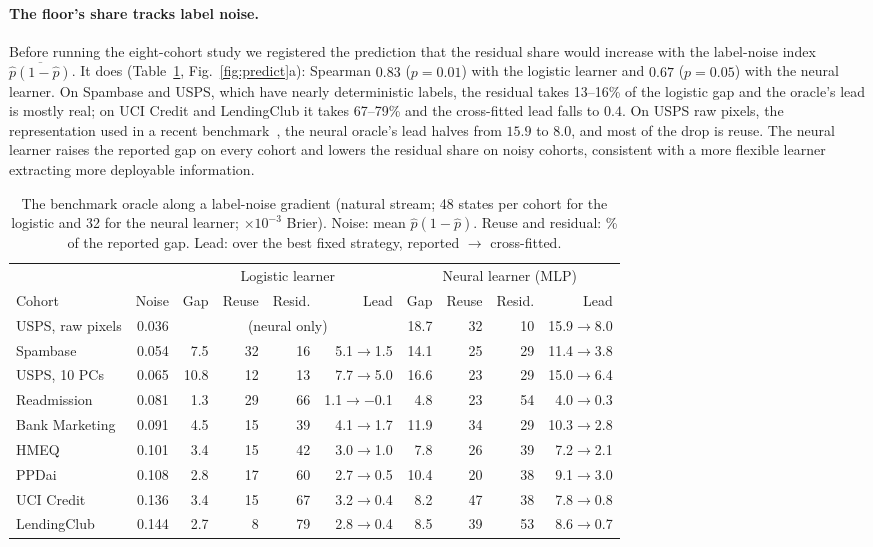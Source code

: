 \documentclass[runningheads]{llncs}
\begin{document}
\paragraph{The floor's share tracks label noise.} Before running the eight-cohort study we registered the prediction that the residual share would increase with the label-noise index $\overline{\hat p(1-\hat p)}$. It does (Table~\ref{tab:gradient}, Fig.~\ref{fig:predict}a): Spearman $0.83$ ($p=0.01$) with the logistic learner and $0.67$ ($p=0.05$) with the neural learner. On Spambase and USPS, which have nearly deterministic labels, the residual takes 13--16\% of the logistic gap and the oracle's lead is mostly real; on UCI Credit and LendingClub it takes 67--79\% and the cross-fitted lead falls to $0.4$. On USPS raw pixels, the representation used in a recent benchmark~\cite{werner2024cdalbench}, the neural oracle's lead halves from $15.9$ to $8.0$, and most of the drop is reuse. The neural learner raises the reported gap on every cohort and lowers the residual share on noisy cohorts, consistent with a more flexible learner extracting more deployable information.

\begin{table}[t]
\caption{The benchmark oracle along a label-noise gradient (natural stream; 48 states per cohort for the logistic and 32 for the neural learner; $\times10^{-3}$ Brier). Noise: mean $\hat p(1-\hat p)$. Reuse and residual: \% of the reported gap. Lead: over the best fixed strategy, reported $\to$ cross-fitted.}
\label{tab:gradient}
\centering\scriptsize
\setlength{\tabcolsep}{2.6pt}
\begin{tabular}{lrrrrrrrrr}
\toprule
& & \multicolumn{4}{c}{Logistic learner} & \multicolumn{4}{c}{Neural learner (MLP)} \\
\cmidrule(lr){3-6}\cmidrule(lr){7-10}
Cohort & Noise & Gap & Reuse & Resid. & Lead & Gap & Reuse & Resid. & Lead \\
\midrule
USPS, raw pixels & 0.036 & \multicolumn{4}{c}{(neural only)} & 18.7 & 32 & 10 & 15.9$\to$8.0 \\
Spambase & 0.054 & 7.5 & 32 & 16 & 5.1$\to$1.5 & 14.1 & 25 & 29 & 11.4$\to$3.8 \\
USPS, 10 PCs & 0.065 & 10.8 & 12 & 13 & 7.7$\to$5.0 & 16.6 & 23 & 29 & 15.0$\to$6.4 \\
Readmission & 0.081 & 1.3 & 29 & 66 & 1.1$\to$$-$0.1 & 4.8 & 23 & 54 & 4.0$\to$0.3 \\
Bank Marketing & 0.091 & 4.5 & 15 & 39 & 4.1$\to$1.7 & 11.9 & 34 & 29 & 10.3$\to$2.8 \\
HMEQ & 0.101 & 3.4 & 15 & 42 & 3.0$\to$1.0 & 7.8 & 26 & 39 & 7.2$\to$2.1 \\
PPDai & 0.108 & 2.8 & 17 & 60 & 2.7$\to$0.5 & 10.4 & 20 & 38 & 9.1$\to$3.0 \\
UCI Credit & 0.136 & 3.4 & 15 & 67 & 3.2$\to$0.4 & 8.2 & 47 & 38 & 7.8$\to$0.8 \\
LendingClub & 0.144 & 2.7 & 8 & 79 & 2.8$\to$0.4 & 8.5 & 39 & 53 & 8.6$\to$0.7 \\
\bottomrule
\end{tabular}
\end{table}
\end{document}
